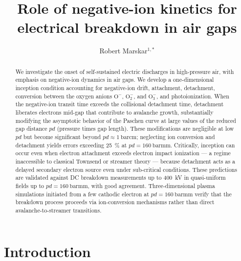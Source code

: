 \documentclass{iopjournal}
\providecommand\Otwom{\ensuremath{\textrm{O}_2^-}}
\providecommand\Othreem{\ensuremath{\textrm{O}_3^-}}
\providecommand\Ominus{\ensuremath{\textrm{O}^-}}
\begin{document}
\title{Role of negative-ion kinetics for electrical breakdown in air gaps}

\author{Robert Marskar$^{1,*}$}%






\begin{abstract}
  \small
  We investigate the onset of self-sustained electric discharges in high-pressure air, with emphasis on negative-ion dynamics in air gaps.
  We develop a one-dimensional inception condition accounting for negative-ion drift, attachment, detachment, conversion between the oxygen anions \Ominus, \Otwom, and \Othreem, and photoionization.
  When the negative-ion transit time exceeds the collisional detachment time, detachment liberates electrons mid-gap that contribute to avalanche growth, substantially modifying the asymptotic behavior of the Paschen curve at large values of the reduced gap distance $pd$ (pressure times gap length).
  These modifications are negligible at low $pd$ but become significant beyond $pd \approx \SI{1}{\bar\centi\meter}$; neglecting ion conversion and detachment yields errors exceeding \SI{25}{\percent} at $pd = \SI{160}{\bar\milli\meter}$.
  Critically, inception can occur even when electron attachment exceeds electron impact ionization --- a regime inaccessible to classical Townsend or streamer theory --- because detachment acts as a delayed secondary electron source even under sub-critical conditions.
  These predictions are validated against DC breakdown measurements up to \SI{400}{\kilo\volt} in quasi-uniform fields up to $pd = \SI{160}{\bar\milli\meter}$, with good agreement.
  Three-dimensional plasma simulations initiated from a few cathodic electron at $pd = \SI{160}{\bar\milli\meter}$ verify that the breakdown process proceeds via ion-conversion mechanisms rather than direct avalanche-to-streamer transitions.
\end{abstract}

\section{Introduction}
\end{document}
